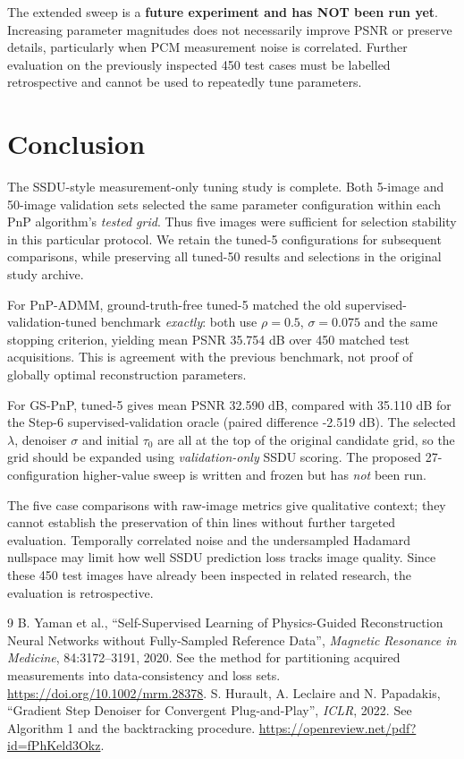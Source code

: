 \documentclass[a4paper,10pt]{article}
\begin{document}
The extended sweep is a \textbf{future experiment and has NOT been
run yet}. Increasing parameter magnitudes does not necessarily improve
PSNR or preserve details, particularly when PCM measurement noise
is correlated. Further evaluation on the previously inspected 450
test cases must be labelled retrospective and cannot be used to
repeatedly tune parameters.


\section{Conclusion}

The SSDU-style measurement-only tuning study is complete.
Both 5-image and 50-image validation sets selected the same
parameter configuration within each PnP algorithm's \emph{tested grid}.
Thus five images were sufficient for selection stability in this
particular protocol. We retain the tuned-5 configurations for subsequent
comparisons, while preserving all tuned-50 results and selections in
the original study archive.

For PnP-ADMM, ground-truth-free tuned-5 matched the old
supervised-validation-tuned benchmark \emph{exactly}: both use
$\rho=0.5$, $\sigma=0.075$ and the same stopping criterion, yielding
mean PSNR 35.754 dB over 450 matched test acquisitions.
This is agreement with the previous benchmark, not proof of globally
optimal reconstruction parameters.

For GS-PnP, tuned-5 gives mean PSNR 32.590 dB, compared with
35.110 dB for the Step-6 supervised-validation oracle (paired
difference -2.519 dB). The selected $\lambda$, denoiser $\sigma$ and
initial $\tau_0$ are all at the top of the original candidate grid,
so the grid should be expanded using \emph{validation-only} SSDU
scoring. The proposed 27-configuration higher-value sweep is written
and frozen but has \emph{not} been run.

The five case comparisons with raw-image metrics give qualitative
context; they cannot establish the preservation of thin lines without
further targeted evaluation. Temporally correlated noise and the
undersampled Hadamard nullspace may limit how well SSDU prediction
loss tracks image quality. Since these 450 test images have already
been inspected in related research, the evaluation is retrospective.

\renewcommand{\refname}{Primary references}
\begin{thebibliography}{9}
 B. Yaman et al., ``Self-Supervised Learning of Physics-Guided Reconstruction Neural Networks without Fully-Sampled Reference Data'', \emph{Magnetic Resonance in Medicine}, 84:3172--3191, 2020. See the method for partitioning acquired measurements into data-consistency and loss sets. \url{https://doi.org/10.1002/mrm.28378}.
 S. Hurault, A. Leclaire and N. Papadakis, ``Gradient Step Denoiser for Convergent Plug-and-Play'', \emph{ICLR}, 2022. See Algorithm 1 and the backtracking procedure. \url{https://openreview.net/pdf?id=fPhKeld3Okz}.
\end{thebibliography}
\end{document}
